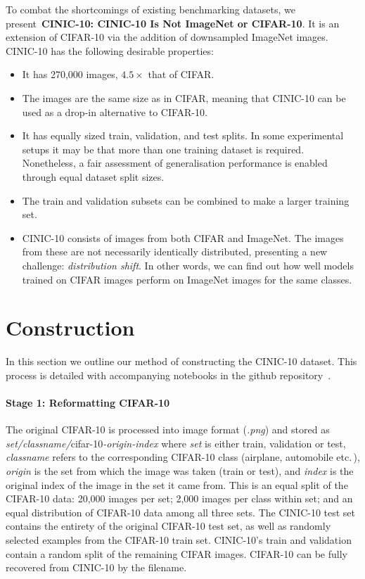 \documentclass[coverpage]{Style/inftechrep}
\begin{document}
To combat the shortcomings of existing benchmarking datasets, we present{~\bf CINIC-10: CINIC-10 Is Not ImageNet or CIFAR-10}. It is an extension of CIFAR-10 via the addition of downsampled ImageNet images. CINIC-10 has the following desirable properties:

\begin{itemize}
\item It has 270,000 images, $4.5\times$ that of CIFAR.
\item The images are the same size as in CIFAR, meaning that CINIC-10 can be used as a drop-in alternative to CIFAR-10.
\item It has equally sized train, validation, and test splits. In some experimental setups it may be that more than one training dataset is required. Nonetheless, a fair assessment of generalisation performance is enabled through equal dataset split sizes. 
\item The train and validation subsets can be combined to make a larger training set.
\item CINIC-10 consists of images from both CIFAR and ImageNet. The images from these are not necessarily identically distributed, presenting a new challenge: \emph{distribution shift}. In other words, we can find out how well models trained on CIFAR images perform on ImageNet images for the same classes.

\end{itemize}





\section{Construction}

In this section we outline our method of constructing the CINIC-10 dataset. This process is detailed with accompanying notebooks in the github repository~\citep{cinic2018github}. 

\paragraph{Stage 1: Reformatting CIFAR-10} 
The original CIFAR-10 is processed into image format (\textit{.png}) and stored as {\it set/classname/}cifar-10{\it-origin-index} where {\it set} is either train, validation or test, {\it classname} refers to the corresponding CIFAR-10 class (airplane, automobile etc.\,), {\it origin} is the set from which the image was taken (train or test), and {\it index} is the original index of the image in the set it came from. This is an equal split of the CIFAR-10 data: 20,000 images per set; 2,000 images per class within set; and an equal distribution of CIFAR-10 data among all three sets. The CINIC-10 test set contains the entirety of the original CIFAR-10 test set, as well as randomly selected examples from the CIFAR-10 train set. CINIC-10's train and validation contain a random split of the remaining CIFAR images. CIFAR-10 can be fully recovered from CINIC-10 by the filename. 
\end{document}
